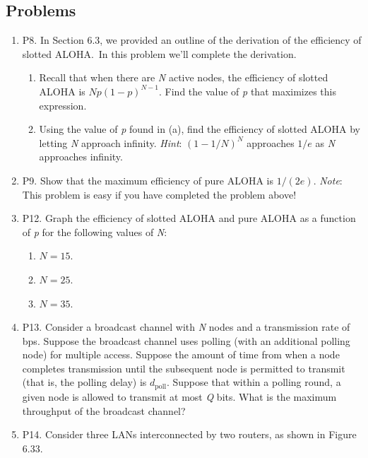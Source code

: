 \documentclass[12pt]{article}
\begin{document}
\subsection*{Problems}
\begin{enumerate}
    \item P8. In Section 6.3, we provided an outline of the derivation of the efficiency of slotted ALOHA.\ In this problem we’ll complete the derivation.
    \begin{enumerate}
        \item Recall that when there are \textit{N} active nodes, the efficiency of slotted ALOHA is \(Np{(1 - p)}^{N-1}\). Find the value of \textit{p} that maximizes this expression.
        \item Using the value of \textit{p} found in (a), find the efficiency of slotted ALOHA by letting \textit{N} approach infinity. \textit{Hint}: \({(1 - 1/N)}^N\) approaches \(1/e\) as \textit{N} approaches infinity.
    \end{enumerate}
    \item P9. Show that the maximum efficiency of pure ALOHA is \(1/(2e)\). \textit{Note}: This problem is easy if you have completed the problem above!
    \item P12. Graph the efficiency of slotted ALOHA and pure ALOHA as a function of \textit{p} for the following values of \textit{N}:
    \begin{enumerate}
        \item \(N=15\).
        \item \(N=25\).
        \item \(N=35\).
    \end{enumerate}
    \item P13. Consider a broadcast channel with \textit{N} nodes and a transmission rate of  bps. Suppose the broadcast channel uses polling (with an additional polling node) for multiple access. Suppose the amount of time from when a node completes transmission until the subsequent node is permitted to transmit (that is, the polling delay) is \(d_{\mathrm{poll}}\). Suppose that within a polling round, a given node is allowed to transmit at most \textit{Q} bits. What is the maximum throughput of the broadcast channel?
    \item P14. Consider three LANs interconnected by two routers, as shown in Figure 6.33.
    \begin{figure}[h!]
        \centering

\end{figure}
\end{enumerate}
\end{document}
